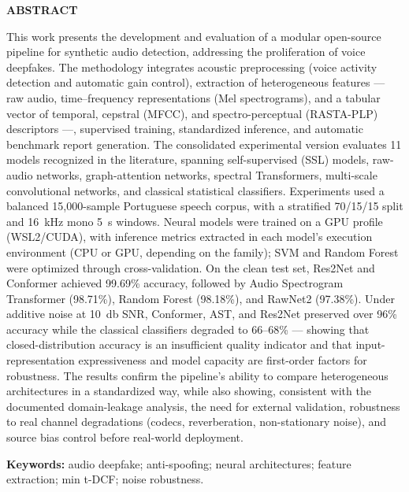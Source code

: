\documentclass[12pt,a4paper]{article}
\begin{document}
\vspace{1cm}
\begin{center}\textbf{ABSTRACT}\end{center}
\vspace{0.5cm}
\begin{singlespace}
\noindent
This work presents the development and evaluation of a modular open-source
pipeline for synthetic audio detection, addressing the proliferation of voice
deepfakes. The methodology integrates acoustic preprocessing (voice activity
detection and automatic gain control), extraction of heterogeneous features ---
raw audio, time--frequency representations (Mel spectrograms), and a tabular
vector of temporal, cepstral (MFCC), and spectro-perceptual (RASTA-PLP)
descriptors ---, supervised training, standardized inference, and automatic
benchmark report generation. The consolidated experimental version evaluates
\num{11} models recognized in the literature, spanning self-supervised (SSL)
models, raw-audio networks, graph-attention networks, spectral Transformers,
multi-scale convolutional networks, and classical statistical classifiers.
Experiments used a balanced 15,000-sample Portuguese speech corpus, with a
stratified 70/15/15 split and \SI{16}{\kilo\hertz} mono \SI{5}{\second} windows.
Neural models were trained on a GPU profile (WSL2/CUDA), with inference metrics
extracted in each model's execution environment (CPU or GPU, depending on the
family); SVM and Random Forest were optimized through cross-validation. On the clean test set, Res2Net and Conformer achieved
99.69\% accuracy, followed by Audio Spectrogram Transformer
(98.71\%), Random Forest (98.18\%), and RawNet2 (97.38\%).
Under additive noise at \SI{10}{\decibel} SNR, Conformer, AST, and Res2Net
preserved over \num{96}\% accuracy while the classical classifiers degraded to
\num{66}--\num{68}\% --- showing that closed-distribution accuracy is an
insufficient quality indicator and that input-representation expressiveness
and model capacity are first-order factors for robustness. The results confirm the pipeline's ability
to compare heterogeneous architectures in a standardized way, while also
showing, consistent with the documented domain-leakage analysis, the need for
external validation, robustness to real channel degradations (codecs,
reverberation, non-stationary noise), and source bias control before
real-world deployment.

\vspace{0.4cm}
\noindent\textbf{Keywords:} audio deepfake; anti-spoofing; neural architectures;
feature extraction; min t-DCF; noise robustness.
\end{singlespace}
\end{document}
